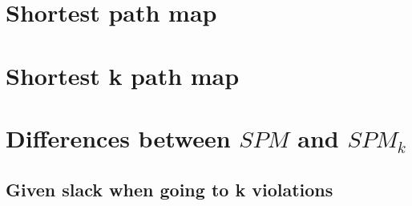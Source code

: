 \section{Shortest path map}

\section{Shortest k path map}

\section{Differences between $SPM$ and $SPM_k$}

\subsection{Given slack when going to k violations}
